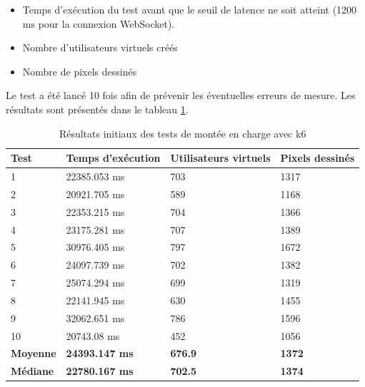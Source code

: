 \begin{itemize}
  \item Temps d'exécution du test avant que le seuil de latence ne soit atteint (1200 ms pour la connexion WebSocket).
  \item Nombre d'utilisateurs virtuels créés
  \item Nombre de pixels dessinés
\end{itemize}

Le test a été lancé 10 fois afin de prévenir les éventuelles erreurs de mesure. Les résultats sont présentés dans le tableau \ref{table:k6-initial-results}.

\begin{table}[H]
  \centering
  \begin{tabular}{|l|l|l|l|}
    \hline
    \textbf{Test}    & \textbf{Temps d'exécution} & \textbf{Utilisateurs virtuels} & \textbf{Pixels dessinés} \\ \hline
    1                & 22385.053 ms               & 703                            & 1317                     \\ \hline
    2                & 20921.705 ms               & 589                            & 1168                     \\ \hline
    3                & 22353.215 ms               & 704                            & 1366                     \\ \hline
    4                & 23175.281 ms               & 707                            & 1389                     \\ \hline
    5                & 30976.405 ms               & 797                            & 1672                     \\ \hline
    6                & 24097.739 ms               & 702                            & 1382                     \\ \hline
    7                & 25074.294 ms               & 699                            & 1319                     \\ \hline
    8                & 22141.945 ms               & 630                            & 1455                     \\ \hline
    9                & 32062.651 ms               & 786                            & 1596                     \\ \hline
    10               & 20743.08 ms                & 452                            & 1056                     \\ \hline
    \textbf{Moyenne} & \textbf{24393.147 ms}      & \textbf{676.9}                 & \textbf{1372}            \\ \hline
    \textbf{Médiane} & \textbf{22780.167 ms}      & \textbf{702.5}                 & \textbf{1374}            \\ \hline
  \end{tabular}
  \caption{Résultats initiaux des tests de montée en charge avec k6}
  \label{table:k6-initial-results}
\end{table}

